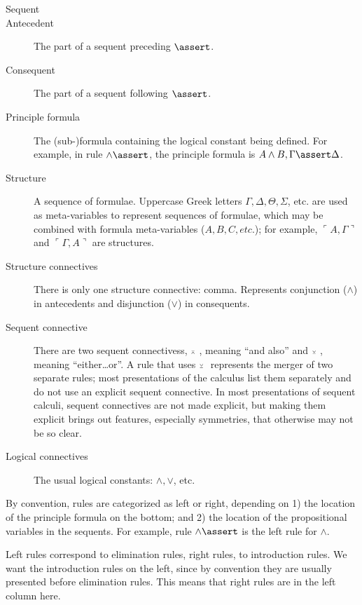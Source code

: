 \documentclass{article}
\begin{document}
\begin{description}
\item[Sequent]
  \item[Antecedent] The part of a sequent preceding \(\linfer\).
  \item[Consequent] The part of a sequent following \(\linfer\).
  \item[Principle formula] The (sub-)formula containing the logical
    constant being defined. For example, in rule \(\land\linfer\), the
    principle formula is \mbox{\(A\land B,\Gamma\linfer \Delta\)}.
  \item[Structure] A sequence of formulae. Uppercase Greek letters
    \(\Gamma, \Delta, \Theta, \Sigma\), etc. are used as
    meta-variables to represent sequences of formulae, which may be
    combined with formula meta-variables (\(A, B, C, etc.\)); for
    example, \(\ulcorner A,\Gamma\urcorner\) and \(\ulcorner \Gamma,
    A\urcorner\) are structures.
    \item[Structure connectives] There is only one structure
      connective: comma. Represents conjunction (\(\land\)) in
      antecedents and disjunction (\(\lor\)) in consequents.
    \item[Sequent connective] There are two sequent connectivess,
      \(\scriptscriptstyle\barwedge\ \), meaning ``and also'' and \(\scriptscriptstyle\veebar\ \), meaning
      ``either\ldots or''. A rule that uses \(\scriptscriptstyle\veebar\ \) represents the
      merger of two separate rules; most presentations of the calculus
      list them separately and do not use an explicit sequent
      connective. In most presentations of sequent calculi, sequent
      connectives are not made explicit, but making them explicit
      brings out features, especially symmetries, that otherwise may
      not be so clear.
    \item[Logical connectives] The usual logical constants: \(\land,
      \lor\), etc.
\end{description}

By convention, rules are categorized as left or right, depending on 1)
the location of the principle formula on the bottom; and 2) the
location of the propositional variables in the sequents. For example,
rule \(\land\linfer\) is the left rule for \(\land\).

Left rules correspond to elimination rules, right rules, to
introduction rules. We want the introduction rules on the left, since
by convention they are usually presented before elimination rules.
This means that right rules are in the left column here.
\end{document}
